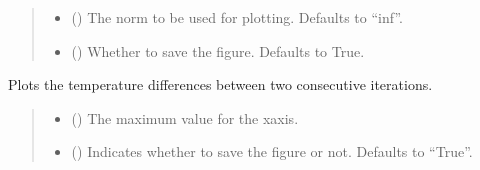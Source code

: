\documentclass[a4paper,11pt,english,openany]{sphinxmanual}
\begin{document}
\begin{fulllineitems}
\begin{fulllineitems}
\begin{quote}
\begin{description}
\begin{itemize}
\item {} 
\sphinxAtStartPar
{} (\sphinxstyleliteralemphasis{\sphinxupquote{, }}) \textendash{} The norm to be used for plotting. Defaults to “inf”.

\item {} 
\sphinxAtStartPar
{} (\sphinxstyleliteralemphasis{\sphinxupquote{, }}) \textendash{} Whether to save the figure. Defaults to True.

\end{itemize}

\end{description}\end{quote}

\end{fulllineitems}


\begin{fulllineitems}
\label{\detokenize{api/spyice.postprocess.visualise_model:src.spyice.postprocess.visualise_model.VisualiseModel.plot_error_temp_diff}}
\pysigstartsignatures
\pysiglinewithargsret
{}
{\sphinxparamcomma {}}
{}
\pysigstopsignatures
\sphinxAtStartPar
Plots the temperature differences between two consecutive iterations.
\begin{quote}\begin{description}
\begin{itemize}
\item {} 
\sphinxAtStartPar
{} () \textendash{} The maximum value for the x\sphinxhyphen{}axis.

\item {} 
\sphinxAtStartPar
{} (\sphinxstyleliteralemphasis{\sphinxupquote{, }}) \textendash{} Indicates whether to save the figure or not. Defaults to “True”.


\end{itemize}
\end{description}
\end{quote}
\end{fulllineitems}
\end{fulllineitems}
\end{document}
